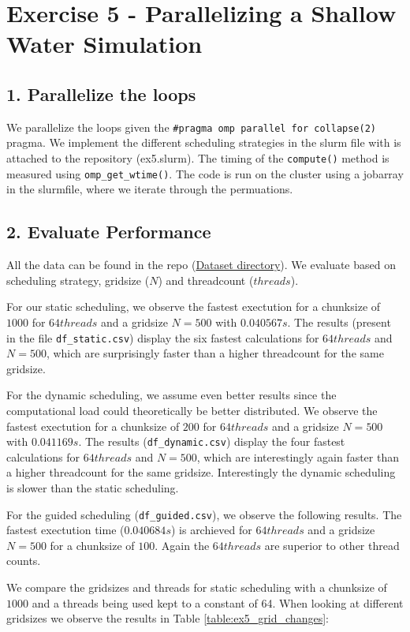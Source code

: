 \documentclass[a4paper,10pt]{article}
\begin{document}
\section{Exercise 5 - Parallelizing a Shallow Water Simulation}
\subsection{1. Parallelize the loops}
We parallelize the loops given the \verb|#pragma omp parallel for collapse(2)| pragma. 
We implement the different scheduling strategies in the slurm file with is attached to the repository (ex5.slurm).
The timing of the \verb|compute()| method is measured using \verb|omp_get_wtime()|.
The code is run on the cluster using a jobarray in the slurmfile, where we iterate through the permuations.

\subsection{2. Evaluate Performance}
All the data can be found in the repo (\href{https://github.com/paulmyr/DD2356-MethodsHPC/tree/master/3_open_mp/exercise5/data}{Dataset directory}).
We evaluate based on scheduling strategy, gridsize ($N$) and threadcount ($threads$).

For our static scheduling, we observe the fastest exectution for a chunksize of $ 1000 $ for $64 threads$ and a gridsize $N=500$ with $0.040567 s$.
The results (present in the file \verb|df_static.csv|) display the six fastest calculations for $64 threads$ and $N=500$, which are surprisingly faster than a higher threadcount for the same gridsize.

For the dynamic scheduling, we assume even better results since the computational load could theoretically be better distributed. 
We observe the fastest exectution for a chunksize of $ 200 $ for $64 threads$ and a gridsize $N=500$ with $0.041169 s$.
The results (\verb|df_dynamic.csv|) display the four fastest calculations for $64 threads$ and $N=500$, which are interestingly again faster than a higher threadcount for the same gridsize.
Interestingly the dynamic scheduling is slower than the static scheduling.

For the guided scheduling (\verb|df_guided.csv|), we observe the following results. The fastest exectution time ($0.040684 s$) is archieved for $64 threads$ and a gridsize $N=500$ for a chunksize of $100$.
Again the $64 threads$ are superior to other thread counts.

We compare the gridsizes and threads for static scheduling with a chunksize of $1000$ and a threads being used kept to a constant of 64. When looking at different gridsizes we observe the results in Table \ref{table:ex5_grid_changes}:
\end{document}
